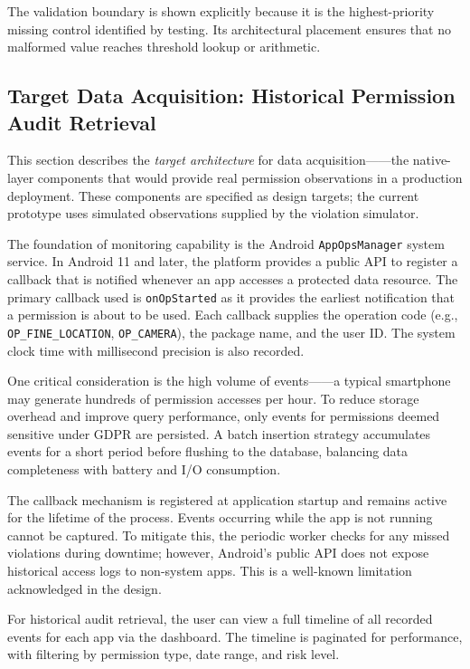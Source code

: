 The validation boundary is shown explicitly because it is the highest-priority missing control identified by testing. Its architectural placement ensures that no malformed value reaches threshold lookup or arithmetic.

\subsection{Target Data Acquisition: Historical Permission Audit Retrieval}

This section describes the \emph{target architecture} for data acquisition——the native-layer components that would provide real permission observations in a production deployment. These components are specified as design targets; the current prototype uses simulated observations supplied by the violation simulator.

The foundation of monitoring capability is the Android \texttt{AppOpsManager} system service. In Android 11 and later, the platform provides a public API to register a callback that is notified whenever an app accesses a protected data resource. The primary callback used is \texttt{onOpStarted} as it provides the earliest notification that a permission is about to be used. Each callback supplies the operation code (e.g., \texttt{OP\_FINE\_LOCATION}, \texttt{OP\_CAMERA}), the package name, and the user ID. The system clock time with millisecond precision is also recorded.

One critical consideration is the high volume of events——a typical smartphone may generate hundreds of permission accesses per hour. To reduce storage overhead and improve query performance, only events for permissions deemed sensitive under GDPR are persisted. A batch insertion strategy accumulates events for a short period before flushing to the database, balancing data completeness with battery and I/O consumption.

The callback mechanism is registered at application startup and remains active for the lifetime of the process. Events occurring while the app is not running cannot be captured. To mitigate this, the periodic worker checks for any missed violations during downtime; however, Android's public API does not expose historical access logs to non-system apps. This is a well-known limitation acknowledged in the design.

For historical audit retrieval, the user can view a full timeline of all recorded events for each app via the dashboard. The timeline is paginated for performance, with filtering by permission type, date range, and risk level.

